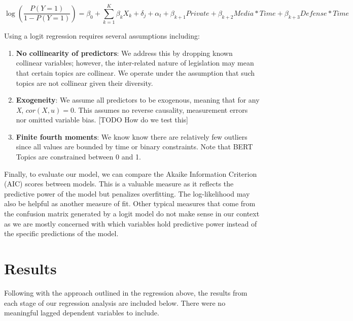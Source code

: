 \documentclass{article}
\begin{document}
\begin{equation}
\log\left( \frac{P(Y=1)}{1 - P(Y=1)} \right) = \beta_0 + \sum_{k=1}^{K} \beta_k X_k + \delta_j + \alpha_t + \beta_{k+1}Private + \beta_{k+2}Media*Time + \beta_{k+3}Defense*Time
\end{equation}

Using a logit regression requires several assumptions including:
\\
\begin{adjustwidth}{2em}{0em}
\begin{enumerate}
    \item \textbf{No collinearity of predictors}: We address this by dropping known collinear variables; however, the inter-related nature of legislation may mean that certain topics are collinear. We operate under the assumption that such topics are not collinear given their diversity. 
    \item \textbf{Exogeneity}: We assume all predictors to be exogenous, meaning that for any \textit{X}, $cor(X,u) = 0$. This assumes no reverse causality, measurement errors nor omitted variable bias. [TODO How do we test this]
    \item \textbf{Finite fourth moments}: We know know there are relatively few outliers since all values are bounded by time or binary constraints. Note that BERT Topics are constrained between 0 and 1. 
\end{enumerate}
\end{adjustwidth}

Finally, to evaluate our model, we can compare the Akaike Information Criterion (AIC) scores between models. This is a valuable measure as it reflects the predictive power of the model but penalizes overfitting. The log-likelihood may also be helpful as another measure of fit. Other typical measures that come from the confusion matrix generated by a logit model do not make sense in our context as we are mostly concerned with which variables hold predictive power instead of the specific predictions of the model. 


\section{Results}

Following with the approach outlined in the regression above, the results from each stage of our regression analysis are included below. There were no meaningful lagged dependent variables to include.
\end{document}

